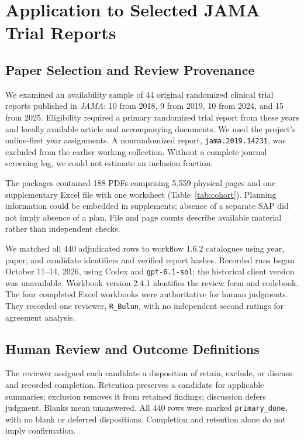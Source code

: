\section{Application to Selected JAMA Trial Reports}
\label{sec:application}

\subsection{Paper Selection and Review Provenance}

We examined an availability sample of 44 original randomized clinical trial reports published in \textit{JAMA}: 10 from 2018, 9 from 2019, 10 from 2024, and 15 from 2025. Eligibility required a primary randomized trial report from these years and locally available article and accompanying documents. We used the project's online-first year assignments. A nonrandomized report, \texttt{jama.2019.14231}, was excluded from the earlier working collection. Without a complete journal screening log, we could not estimate an inclusion fraction.

The packages contained 188 PDFs comprising 5,559 physical pages and one supplementary Excel file with one worksheet (Table~\ref{tab:cohort}). Planning information could be embedded in supplements; absence of a separate SAP did not imply absence of a plan. File and page counts describe available material rather than independent checks.

We matched all 440 adjudicated rows to workflow 1.6.2 catalogues using year, paper, and candidate identifiers and verified report hashes. Recorded runs began October 11--14, 2026, using Codex and \texttt{gpt-6.1-sol}; the historical client version was unavailable. Workbook version 2.4.1 identifies the review form and codebook. The four completed Excel workbooks were authoritative for human judgments. They recorded one reviewer, \texttt{R\_Bulun}, with no independent second ratings for agreement analysis.

\subsection{Human Review and Outcome Definitions}
\label{sec:codebook}

The reviewer assigned each candidate a disposition of retain, exclude, or discuss and recorded completion. Retention preserves a candidate for applicable summaries; exclusion removes it from retained findings; discussion defers judgment. Blanks mean unanswered. All 440 rows were marked \texttt{primary\_done}, with no blank or deferred dispositions. Completion and retention alone do not imply confirmation.

